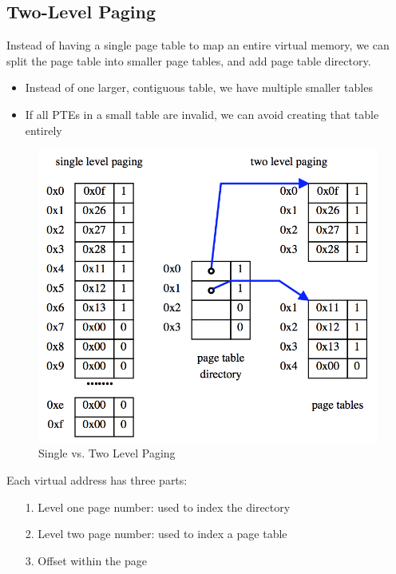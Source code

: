 \documentclass[12pt]{article}
\theoremstyle{plain}
\theoremstyle{definition}
\begin{document}
\subsection{Two-Level Paging}
Instead of having a single page table to map an entire virtual memory, we can split the page table into smaller page tables, and add page table directory.
\begin{itemize}
  \item Instead of one larger, contiguous table, we have multiple smaller tables
  \item If all PTEs in a small table are invalid, we can avoid creating that table entirely
\end{itemize}
\begin{figure}[H]
  \centering
  \includegraphics[scale=0.7]{pictures/single_double_paging.png}
  \caption{Single vs. Two Level Paging}
  \label{fig:s_t_paging}
\end{figure}
Each virtual address has three parts:
\begin{enumerate}
  \item[1.] Level one page number: used to index the directory
  \item[2.] Level two page number: used to index a page table
  \item[3.] Offset within the page
\end{enumerate}
\end{document}
